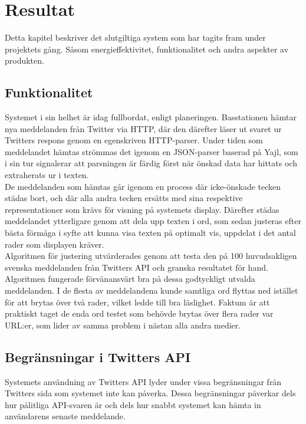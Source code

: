 \documentclass[a4paper,11pt]{article}
\begin{document}
\section{Resultat}

Detta kapitel beskriver det slutgiltiga system som har tagits fram under projektets gång. Såsom energieffektivitet, funktionalitet och andra aspekter av produkten.

\subsection{Funktionalitet}

Systemet i sin helhet är idag fullbordat, enligt planeringen. Basstationen hämtar nya meddelanden från Twitter via HTTP, där den därefter läser ut svaret ur Twitters respons genom en egenskriven HTTP-parser. Under tiden som meddelandet hämtas strömmas det igenom en JSON-parser baserad på Yajl, som i sin tur signalerar att parsningen är färdig först när önskad data har hittats och extraherats ur i texten.\\

De meddelanden som hämtas går igenom en process där icke-önskade tecken städas bort, och där alla andra tecken ersätts med sina respektive representationer som krävs för visning på systemets display. Därefter städas meddelandet ytterligare genom att dela upp texten i ord, som sedan justeras efter bästa förmåga i syfte att kunna visa texten på optimalt vis, uppdelat i det antal rader som displayen kräver.\\

Algoritmen för justering utvärderades genom att testa den på 100 huvudsakligen svenska meddelanden från Twitters API och granska resultatet för hand. Algoritmen fungerade förvånansvärt bra på dessa godtyckligt utvalda meddelanden. I de flesta av meddelandena kunde samtliga ord flyttas ned istället för att brytas över två rader, vilket ledde till bra läslighet. Faktum är att praktiskt taget de enda ord testet som behövde brytas över flera rader var URL:er, som lider av samma problem i nästan alla andra medier.

\subsection{Begränsningar i Twitters API}

Systemets användning av Twitters API lyder under vissa begränsningar från Twitters sida som systemet inte kan påverka. Dessa begränsningar påverkar dels hur pålitliga API-svaren är och dels hur snabbt systemet kan hämta in användarens senaste meddelande.\\
\end{document}
